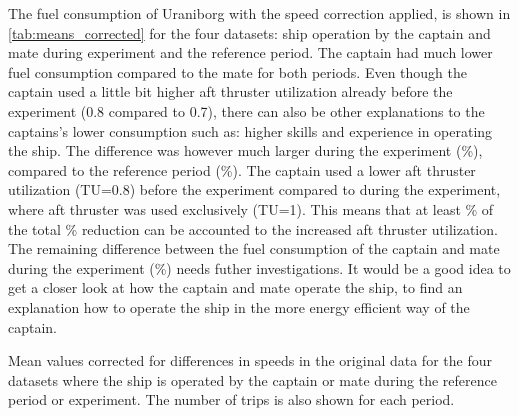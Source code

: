\documentclass[fleqn,10pt]{olplainarticle}
\begin{document}
The fuel consumption of Uraniborg with the speed correction applied, is shown in \autoref{tab:means_corrected} for the four datasets: ship operation by the captain and mate during experiment and the reference period. The captain had much lower fuel consumption compared to the mate for both periods. Even though the captain used a little bit higher aft thruster utilization already before the experiment (0.8 compared to 0.7), there can also be other explanations to the captains's lower consumption such as: higher skills and experience in operating the ship. 
The difference was however much larger during the experiment (\savingpctexperiment \%), compared to the reference period (\savingpctbeforeexperiment \%). The captain used a lower aft thruster utilization (TU=0.8) before the experiment compared to during the experiment, where aft thruster was used exclusively (TU=1). This means that at least \savingthrusterallocationpct \% of the total \savingpctexperiment \% reduction can be accounted to the increased aft thruster utilization. 
The remaining difference between the fuel consumption of the captain and mate during the experiment (\savingpctbeforeexperiment \%) needs futher investigations. It would be a good idea to get a closer look at how the captain and mate operate the ship, to find an explanation how to operate the ship in the more energy efficient way of the captain.

\begin{table}[h]
    \centering
    \caption{Mean values corrected for differences in speeds in the original data for the four datasets where the ship is operated by the captain or mate during the reference period or experiment. The number of trips is also shown for each period.}
    \label{tab:means_corrected}
\end{table}


\end{document}
